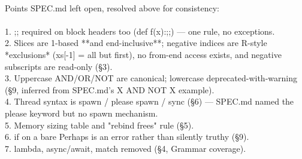 \begin{exbox}
{  \  \\
  Points SPEC.md left open, resolved above for consistency: \\
  \  \\
  1. \textasciigrave{};;\textasciigrave{} required on block headers too (\textasciigrave{}def f(x):;;\textasciigrave{}) --- one rule, no exceptions. \\
  2. Slices are 1-based **and end-inclusive**; negative indices are R-style *exclusions* (\textasciigrave{}xs[-1]\textasciigrave{} = all but first), no from-end access exists, and negative subscripts are read-only (\S{}3). \\
  3. Uppercase \textasciigrave{}AND/OR/NOT\textasciigrave{} are canonical; lowercase deprecated-with-warning (\S{}9, inferred from SPEC.md's \textasciigrave{}X AND NOT X\textasciigrave{} example). \\
  4. Thread syntax is \textasciigrave{}spawn\textasciigrave{} / \textasciigrave{}please spawn\textasciigrave{} / \textasciigrave{}sync\textasciigrave{} (\S{}6) --- SPEC.md named the \textasciigrave{}please\textasciigrave{} keyword but no spawn mechanism. \\
  5. Memory sizing table and "rebind frees" rule (\S{}5). \\
  6. \textasciigrave{}if\textasciigrave{} on a bare Perhaps is an error rather than silently truthy (\S{}9). \\
  7. \textasciigrave{}lambda\textasciigrave{}, \textasciigrave{}async/await\textasciigrave{}, \textasciigrave{}match\textasciigrave{} removed (\S{}4, Grammar coverage).}
\end{exbox}
